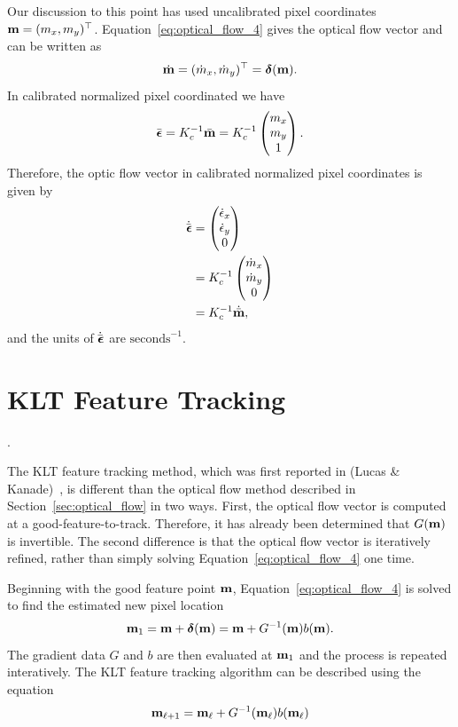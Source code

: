 Our discussion to this point has used uncalibrated pixel coordinates $\mathbf{m} = (m_x, m_y)^\top$.  Equation~\eqref{eq:optical_flow_4} gives the optical flow vector and can be written as
\[
\dot{\mathbf{m}} = (\dot{m}_x, \dot{m}_y)^\top = \boldsymbol{\delta}(\mathbf{m}).
\]
In calibrated normalized pixel coordinated we have
\[
\bar{\boldsymbol{\epsilon}} = K_c^{-1}\bar{\mathbf{m}} = K_c^{-1}\begin{pmatrix} m_x \\ m_y \\ 1 \end{pmatrix}.
\]
Therefore, the optic flow vector in calibrated normalized pixel coordinates is given by
\begin{align*}
\dot{\bar{\boldsymbol{\epsilon}}} &= \begin{pmatrix} \dot{\epsilon}_x \\ \dot{\epsilon}_y \\ 0 \end{pmatrix} \\ 
&= K_c^{-1} \begin{pmatrix} \dot{m}_x \\ \dot{m}_y \\ 0 \end{pmatrix} \\ 
&= K_c^{-1} \dot{\bar{\mathbf{m}}},
\end{align*}
and the units of $\dot{\bar{\boldsymbol{\epsilon}}}$ are $\text{seconds}^{-1}$.

\section{KLT Feature Tracking}
\label{sec:klt_feature_tracking}.

The KLT feature tracking method, which was first reported in (Lucas \& Kanade)~\cite{LucasKanade81}, is different than the optical flow method described in Section~\ref{sec:optical_flow} in two ways. 
First, the optical flow vector is computed at a good-feature-to-track.  Therefore, it has already been determined that $G(\mathbf{m})$ is invertible.  The second difference is that the optical flow vector is iteratively refined, rather than simply solving Equation~\eqref{eq:optical_flow_4} one time.  

Beginning with the good feature point $\mathbf{m}$, Equation~\eqref{eq:optical_flow_4} is solved to find the estimated new pixel location 
\[
\mathbf{m}_1 = \mathbf{m} + \boldsymbol{\delta}(\mathbf{m}) = \mathbf{m} + G^{-1}(\mathbf{m})b(\mathbf{m}).  
\]
The gradient data $G$ and $b$ are then evaluated at $\mathbf{m}_1$ and the process is repeated interatively.  The KLT feature tracking algorithm can be described using the equation
\[
\mathbf{m}_{\ell+1} = \mathbf{m}_\ell + G^{-1}(\mathbf{m}_\ell)b(\mathbf{m}_\ell)  
\]

